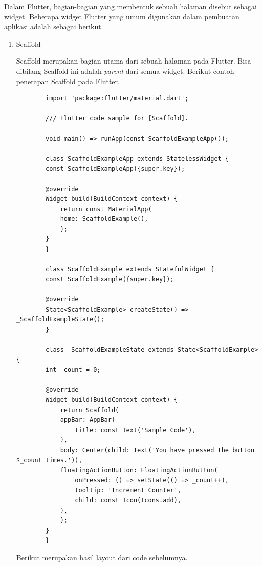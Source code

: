 \begin{spacing}{1.5}
Dalam Flutter, bagian-bagian yang membentuk sebuah halaman disebut sebagai widget. Beberapa widget Flutter yang umum digunakan dalam pembuatan aplikasi adalah sebagai berikut.

\begin{enumerate}
	\item Scaffold
	
	Scaffold merupakan bagian utama dari sebuah halaman pada Flutter. Bisa dibilang Scaffold ini adalah \textit{parent} dari semua widget. Berikut contoh penerapan Scaffold pada Flutter.

	\begin{lstlisting}
		import 'package:flutter/material.dart';

		/// Flutter code sample for [Scaffold].

		void main() => runApp(const ScaffoldExampleApp());

		class ScaffoldExampleApp extends StatelessWidget {
		const ScaffoldExampleApp({super.key});

		@override
		Widget build(BuildContext context) {
			return const MaterialApp(
			home: ScaffoldExample(),
			);
		}
		}

		class ScaffoldExample extends StatefulWidget {
		const ScaffoldExample({super.key});

		@override
		State<ScaffoldExample> createState() => _ScaffoldExampleState();
		}

		class _ScaffoldExampleState extends State<ScaffoldExample> {
		int _count = 0;

		@override
		Widget build(BuildContext context) {
			return Scaffold(
			appBar: AppBar(
				title: const Text('Sample Code'),
			),
			body: Center(child: Text('You have pressed the button $_count times.')),
			floatingActionButton: FloatingActionButton(
				onPressed: () => setState(() => _count++),
				tooltip: 'Increment Counter',
				child: const Icon(Icons.add),
			),
			);
		}
		}

	\end{lstlisting}

	Berikut merupakan hasil layout dari code sebelumnya.


\end{enumerate}
\end{spacing}
